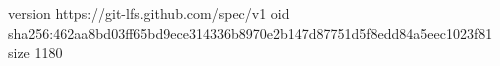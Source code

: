 version https://git-lfs.github.com/spec/v1
oid sha256:462aa8bd03ff65bd9ece314336b8970e2b147d87751d5f8edd84a5eec1023f81
size 1180
